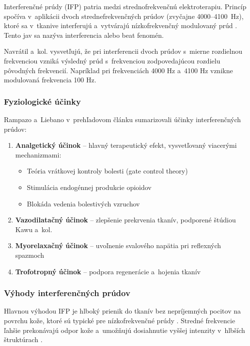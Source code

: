 Interferenčné prúdy (IFP) patria medzi strednofrekvenčnú elektroterapiu. Princíp spočíva v~aplikácii dvoch strednefrekvenčných prúdov (zvyčajne 4000--4100~Hz), ktoré sa v~tkanive interferujú a~vytvárajú nízkofrekvenčný modulovaný prúd \parencite{Watson2020}. Tento jav sa nazýva interferencia alebo beat fenomén.

Navrátil a~kol. \parencite*{Navratil2019} vysvetľujú, že pri interferencii dvoch prúdov s~mierne rozdielnou frekvenciou vzniká výsledný prúd s~frekvenciou zodpovedajúcou rozdielu pôvodných frekvencií. Napríklad pri frekvenciách 4000 Hz a~4100 Hz vznikne modulovaná frekvencia 100 Hz.

\subsubsection{Fyziologické účinky}

Rampazo a~Liebano \parencite*{Rampazo2022} v~prehľadovom článku sumarizovali účinky interferenčných prúdov:

\begin{enumerate}
    \item \textbf{Analgetický účinok} -- hlavný terapeutický efekt, vysvetľovaný viacerými mechanizmami:
    \begin{itemize}
        \item Teória vrátkovej kontroly bolesti (gate control theory)
        \item Stimulácia endogénnej produkcie opioidov
        \item Blokáda vedenia bolestivých vzruchov
    \end{itemize}
    
    \item \textbf{Vazodilatačný účinok} -- zlepšenie prekrvenia tkanív, podporené štúdiou Kawu a~kol. \parencite{Kawa2014}
    
    \item \textbf{Myorelaxačný účinok} -- uvoľnenie svalového napätia pri reflexných spazmoch
    
    \item \textbf{Trofotropný účinok} -- podpora regenerácie a~hojenia tkanív
\end{enumerate}

\subsubsection{Výhody interferenčných prúdov}

Hlavnou výhodou IFP je hlboký prienik do tkanív bez nepríjemných pocitov na povrchu kože, ktoré sú typické pre nízkofrekvenčné prúdy \parencite{Watson2020}. Stredné frekvencie ľahšie prekonávajú odpor kože a~umožňujú dosiahnutie vyššej intenzity v~hlbších štruktúrach \parencite{Navratil2019}.

